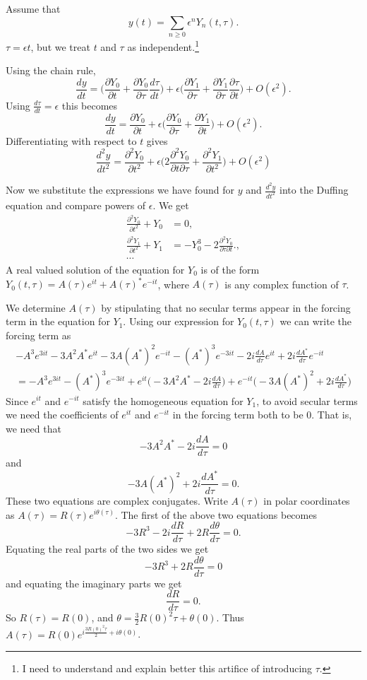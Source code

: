 \documentclass[11pt]{article}
\begin{document}
Assume that 
\[
y(t)=\sum_{n \geq 0} \epsilon^n Y_n(t,\tau).
\]
$\tau=\epsilon t$, but we treat $t$ and $\tau$ as independent.\footnote{I need to understand and explain better this artifice of introducing $\tau$.}

Using the chain rule,
\[
\frac{dy}{dt}=\Big(\frac{\partial Y_0}{\partial t}+\frac{\partial Y_0}{\partial \tau} \frac{d\tau}{dt}\Big)
+\epsilon\Big(\frac{\partial Y_1}{\partial \tau}+\frac{\partial Y_1}{\partial \tau}\frac{\partial \tau}{\partial t}\Big)+O(\epsilon^2).
\]
Using $\frac{d\tau}{dt}=\epsilon$ this becomes
\begin{equation}
\label{dydt}
\frac{dy}{dt}=\frac{\partial Y_0}{\partial t}+\epsilon\Big(\frac{\partial Y_0}{\partial \tau}+\frac{\partial Y_1}{\partial t}\Big)+O(\epsilon^2).
\end{equation}
Differentiating with respect to $t$ gives
\[
\frac{d^2 y}{dt^2}=\frac{\partial^2 Y_0}{\partial t^2}+\epsilon\Big(2\frac{\partial^2 Y_0}{\partial t \partial \tau}+\frac{\partial^2 Y_1}{\partial t^2} \Big)+O(\epsilon^2)
\]

Now we substitute the expressions we have found for $y$ and $\frac{d^2 y}{dt^2}$ into the Duffing equation and compare powers of $\epsilon$. We get
\begin{align*}
\frac{\partial^2 Y_0}{\partial t^2}+Y_0&=0,\\
\frac{\partial^2 Y_1}{\partial t^2}+Y_1&=-Y_0^3-2 \frac{\partial^2 Y_0}{\partial \tau \partial t}.,\\
\cdots&
\end{align*}
A real valued solution of the equation for $Y_0$ is of the form $Y_0(t,\tau)=A(\tau)e^{it}+A(\tau)^*e^{-it}$, where $A(\tau)$ is any complex function of $\tau$. 

We determine $A(\tau)$ by stipulating that no secular terms appear in the forcing term in the equation for $Y_1$. Using our expression for $Y_0(t,\tau)$ we can write the forcing term as
\begin{align*}
-A^3 e^{3it}-3A^2A^*e^{it}-3A(A^*)^2 e^{-it}-(A^*)^3 e^{-3it}
-2i\frac{dA}{d\tau}e^{it}+2i\frac{dA^*}{d\tau}e^{-it}\\
=-A^3 e^{3it}-(A^*)^3 e^{-3it}+e^{it}\Big(-3A^2A^* -2i\frac{dA}{d\tau}\Big)+e^{-it}\Big(-3A(A^*)^2
+2i\frac{dA^*}{d\tau}\Big)
\end{align*}
Since $e^{it}$ and $e^{-it}$ satisfy the homogeneous equation for $Y_1$, to avoid secular terms we need the coefficients of $e^{it}$ and $e^{-it}$ in the forcing term both to be 0. That is, we need that
\[
-3A^2A^* -2i\frac{dA}{d\tau}=0
\]
and
\[
-3A(A^*)^2
+2i\frac{dA^*}{d\tau}=0.
\]
These two equations are complex conjugates. Write $A(\tau)$ in polar coordinates as 
$A(\tau)=R(\tau)e^{i\theta(\tau)}$. The first of the above two equations becomes
\[
-3R^3 -2i \frac{dR}{d \tau} +2R \frac{d\theta}{d\tau}=0.
\]
Equating the real parts of the two sides we get
\[
-3R^3+2R\frac{d\theta}{d\tau}=0
\]
and equating the imaginary parts we get
\[
\frac{dR}{d\tau}=0.
\]
So $R(\tau)=R(0)$, and $\theta=\frac{3}{2}R(0)^2\tau+\theta(0)$. Thus $A(\tau)=R(0)e^{i\frac{3R(0)^2\tau}{2}+i\theta(0)}$.
\end{document}
